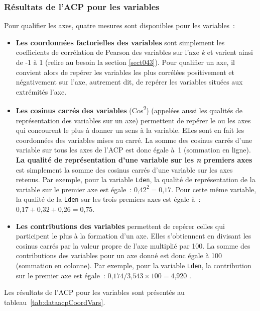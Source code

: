 \documentclass[
  11pt,
  french,
]{book}
\providecommand{\tightlist}{%
  \setlength{\itemsep}{0pt}\setlength{\parskip}{0pt}}
\begin{document}
\hypertarget{sect12222}{%
\subsubsection{Résultats de l'ACP pour les variables}\label{sect12222}}

Pour qualifier les axes, quatre mesures sont disponibles pour les variables~:

\begin{itemize}
\tightlist
\item
  \textbf{Les coordonnées factorielles des variables} sont simplement les coefficients de corrélation de Pearson des variables sur l'axe \emph{k} et varient ainsi de -1 à 1 (relire au besoin la section \ref{sect043}). Pour qualifier un axe, il convient alors de repérer les variables les plus corrélées positivement et négativement sur l'axe, autrement dit, de repérer les variables situées aux extrémités l'axe.
\item
  \textbf{Les cosinus carrés des variables} (Cos\textsuperscript{2}) (appelées aussi les qualités de représentation des variables sur un axe) permettent de repérer le ou les axes qui concourent le plus à donner un sens à la variable. Elles sont en fait les coordonnées des variables mises au carré. La somme des cosinus carrés d'une variable sur tous les axes de l'ACP est donc égale à~1 (sommation en ligne).
  \textbf{La qualité de représentation d'une variable sur les \emph{n} premiers axes} est simplement la somme des cosinus carrés d'une variable sur les axes retenus. Par exemple, pour la variable \texttt{Lden}, la qualité de représentation de la variable sur le premier axe est égale~: \(\mbox{0,42}^2=\mbox{0,17}\). Pour cette même variable, la qualité de la \texttt{Lden} sur les trois premiers axes est égale à~: \(\mbox{0,17}+\mbox{0,32}+\mbox{0,26}=\mbox{0,75}\).
\item
  \textbf{Les contributions des variables} permettent de repérer celles qui participent le plus à la formation d'un axe. Elles s'obtiennent en divisant les cosinus carrés par la valeur propre de l'axe multiplié par 100. La somme des contributions des variables pour un axe donné est donc égale à 100 (sommation en colonne). Par exemple, pour la variable \texttt{Lden}, la contribution sur le premier axe est égale~: \(\mbox{0,174} / \mbox{3,543} \times \mbox{100}= \mbox{4,920 }%
  \).
\end{itemize}

Les résultats de l'ACP pour les variables sont présentés au tableau~\ref{tab:dataacpCoordVars}.
\end{document}
